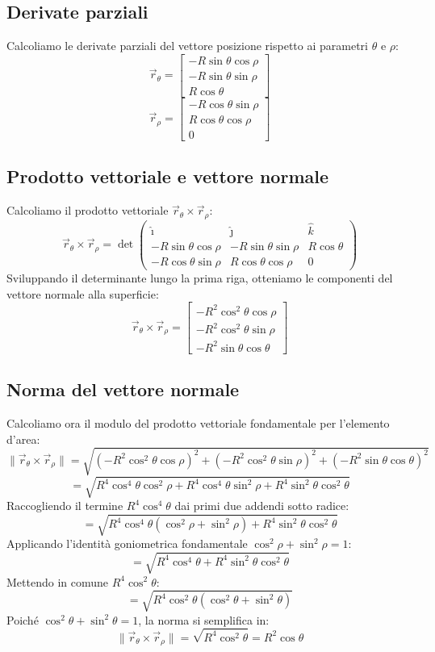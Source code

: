 \subsection{Derivate parziali}
Calcoliamo le derivate parziali del vettore posizione rispetto ai parametri $\theta$ e $\rho$:
\[
\vec{r}_\theta =
\begin{bmatrix}
-R \sin\theta \cos\rho \\
-R \sin\theta \sin\rho \\
R \cos\theta
\end{bmatrix}
\]
\[
\vec{r}_\rho =
\begin{bmatrix}
-R \cos\theta \sin\rho \\
R \cos\theta \cos\rho \\
0
\end{bmatrix}
\]

\subsection{Prodotto vettoriale e vettore normale}
Calcoliamo il prodotto vettoriale $\vec{r}_\theta \times \vec{r}_\rho$:
\[
\vec{r}_\theta \times \vec{r}_\rho = \det
\begin{pmatrix}
\hat{\imath} & \hat{\jmath} & \hat{k} \\
-R \sin\theta \cos\rho & -R \sin\theta \sin\rho & R \cos\theta \\
-R \cos\theta \sin\rho & R \cos\theta \cos\rho & 0
\end{pmatrix}
\]
Sviluppando il determinante lungo la prima riga, otteniamo le componenti del vettore normale alla superficie:
\[
\vec{r}_\theta \times \vec{r}_\rho =
\begin{bmatrix}
-R^2 \cos^2\theta \cos\rho \\
-R^2 \cos^2\theta \sin\rho \\
-R^2 \sin\theta \cos\theta
\end{bmatrix}
\]

\subsection{Norma del vettore normale}
Calcoliamo ora il modulo del prodotto vettoriale fondamentale per l'elemento d'area:
\[
\|\vec{r}_\theta \times \vec{r}_\rho\| = \sqrt{(-R^2 \cos^2\theta \cos\rho)^2 + (-R^2 \cos^2\theta \sin\rho)^2 + (-R^2 \sin\theta \cos\theta)^2}
\]
\[
= \sqrt{R^4 \cos^4\theta \cos^2\rho + R^4 \cos^4\theta \sin^2\rho + R^4 \sin^2\theta \cos^2\theta}
\]
Raccogliendo il termine $R^4 \cos^4\theta$ dai primi due addendi sotto radice:
\[
= \sqrt{R^4 \cos^4\theta (\cos^2\rho + \sin^2\rho) + R^4 \sin^2\theta \cos^2\theta}
\]
Applicando l'identità goniometrica fondamentale $\cos^2\rho + \sin^2\rho = 1$:
\[
= \sqrt{R^4 \cos^4\theta + R^4 \sin^2\theta \cos^2\theta}
\]
Mettendo in comune $R^4 \cos^2\theta$:
\[
= \sqrt{R^4 \cos^2\theta (\cos^2\theta + \sin^2\theta)}
\]
Poiché $\cos^2\theta + \sin^2\theta = 1$, la norma si semplifica in:
\[
\|\vec{r}_\theta \times \vec{r}_\rho\| = \sqrt{R^4 \cos^2\theta} = R^2 \cos\theta
\]

